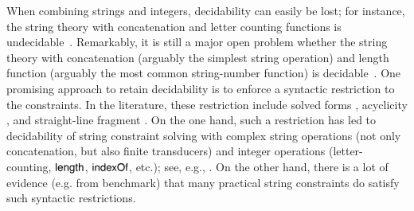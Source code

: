 When combining strings and integers, decidability can easily be lost; 
 for instance, the string theory with concatenation and letter counting
functions is undecidable~\cite{buchi,Manea-RP}.
Remarkably, it is still a major open problem whether the string theory with concatenation (arguably the simplest string operation) and length function 
(arguably the most common string-number function) is 
decidable~\cite{Vijay-length}. 
One promising approach to retain decidability is to enforce a syntactic
restriction to the constraints. In the  literature, these restriction  include solved forms
\cite{Vijay-length}, acyclicity \cite{BFL13,Abdulla14,AbdullaA+19}, and 
straight-line fragment \cite{LB16,CCH+18,CHL+19,HJLRV18}. On the one hand,
such a restriction has led to decidability of string constraint solving with 
complex string
operations (not only concatenation, but also finite transducers) and integer
operations (letter-counting, $\mathsf{length}$, $\mathsf{indexOf}$, etc.); see, e.g., 
\cite{LB16}. On the other hand, there is a lot of evidence (e.g. from 
benchmark) that %
many practical string constraints do satisfy 
such syntactic restrictions.
%
%


